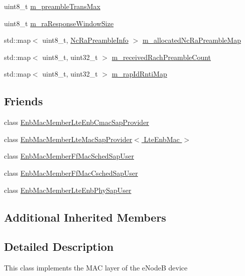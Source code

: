 \begin{DoxyCompactItemize}
uint8\+\_\+t \hyperlink{classns3_1_1LteEnbMac_aa0619f1df983d20233b69ec7dac89af8}{m\+\_\+preamble\+Trans\+Max}
\item 
uint8\+\_\+t \hyperlink{classns3_1_1LteEnbMac_a8d651db96b6da7d09b67d6faa0e0c8a9}{m\+\_\+ra\+Response\+Window\+Size}
\item 
std\+::map$<$ uint8\+\_\+t, \hyperlink{structns3_1_1LteEnbMac_1_1NcRaPreambleInfo}{Nc\+Ra\+Preamble\+Info} $>$ \hyperlink{classns3_1_1LteEnbMac_aa4d985440ec2e62eb521203a8e96e901}{m\+\_\+allocated\+Nc\+Ra\+Preamble\+Map}
\item 
std\+::map$<$ uint8\+\_\+t, uint32\+\_\+t $>$ \hyperlink{classns3_1_1LteEnbMac_a3f2ae0439200f19f8e046510579494a0}{m\+\_\+received\+Rach\+Preamble\+Count}
\item 
std\+::map$<$ uint8\+\_\+t, uint32\+\_\+t $>$ \hyperlink{classns3_1_1LteEnbMac_a8a3ccaeb5f77943019ed39250c3ea63e}{m\+\_\+rap\+Id\+Rnti\+Map}
\end{DoxyCompactItemize}
\subsection*{Friends}
\begin{DoxyCompactItemize}
\item 
class \hyperlink{classns3_1_1LteEnbMac_a5b8d2decd3621c9ccce93583e7ea1406}{Enb\+Mac\+Member\+Lte\+Enb\+Cmac\+Sap\+Provider}
\item 
class \hyperlink{classns3_1_1LteEnbMac_acf8c207283b4e4bfb738d730d99759e3}{Enb\+Mac\+Member\+Lte\+Mac\+Sap\+Provider$<$ Lte\+Enb\+Mac $>$}
\item 
class \hyperlink{classns3_1_1LteEnbMac_a77c76d56aed68ffd465c893fb221feed}{Enb\+Mac\+Member\+Ff\+Mac\+Sched\+Sap\+User}
\item 
class \hyperlink{classns3_1_1LteEnbMac_a2cf628a0313ac933adca815710bf0dbe}{Enb\+Mac\+Member\+Ff\+Mac\+Csched\+Sap\+User}
\item 
class \hyperlink{classns3_1_1LteEnbMac_aea85b209eca52b486627407495ee88ed}{Enb\+Mac\+Member\+Lte\+Enb\+Phy\+Sap\+User}
\end{DoxyCompactItemize}
\subsection*{Additional Inherited Members}


\subsection{Detailed Description}
This class implements the M\+AC layer of the e\+NodeB device 

